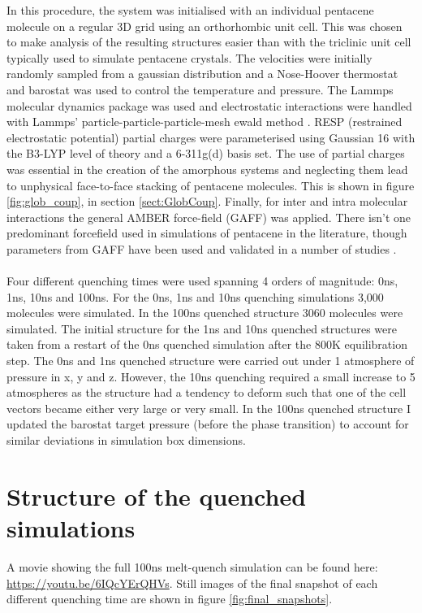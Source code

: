\noindent In this procedure, the system was initialised with an individual pentacene molecule on a regular 3D grid using an orthorhombic unit cell. This was chosen to make analysis of the resulting structures easier than with the triclinic unit cell typically used to simulate pentacene crystals. The velocities were initially randomly sampled from a gaussian distribution and a Nose-Hoover thermostat and barostat was used to control the temperature and pressure. The Lammps molecular dynamics package was used \cite{LammpsMain, LammpsURL} and electrostatic interactions were handled with Lammps' particle-particle-particle-mesh ewald method \cite{LammpsPPPME}. RESP \cite{RESP} (restrained electrostatic potential) partial charges were parameterised using Gaussian 16 \cite{g16} with the B3-LYP\cite{B3,LYP} level of theory and a 6-311g(d) basis set. The use of partial charges was essential in the creation of the amorphous systems and neglecting them lead to unphysical face-to-face stacking of pentacene molecules. This is shown in figure \ref{fig:glob_coup}, in section \ref{sect:GlobCoup}. Finally, for inter and intra molecular interactions the general AMBER force-field \cite{GAFF} (GAFF) was applied. There isn't one predominant forcefield used in simulations of pentacene in the literature, though parameters from GAFF have been used and validated in a number of studies \cite{C0JM01577F, Yoneya2012, PentCrystallisation, MILLER201728, Wang2011, C6CP06436A, doi:10.1246/cl.180450}.
\\\\
Four different quenching times were used spanning 4 orders of magnitude: 0ns, 1ns, 10ns and 100ns. For the 0ns, 1ns and 10ns quenching simulations 3,000 molecules were simulated. In the 100ns quenched structure 3060 molecules were simulated. The initial structure for the 1ns and 10ns quenched structures were taken from a restart of the 0ns quenched simulation after the 800K equilibration step. The 0ns and 1ns quenched structure were carried out under 1 atmosphere of pressure in x, y and z. However, the 10ns quenching required a small increase to 5 atmospheres as the structure had a tendency to deform such that one of the cell vectors became either very large or very small. In the 100ns quenched structure I updated the barostat target pressure (before the phase transition) to account for similar deviations in simulation box dimensions.
\section{Structure of the quenched simulations}
A movie showing the full 100ns melt-quench simulation can be found here: \href{https://youtu.be/6IQcYErQHVs}{https://youtu.be/6IQcYErQHVs}. Still images of the final snapshot of each different quenching time are shown in figure \ref{fig:final_snapshots}.
